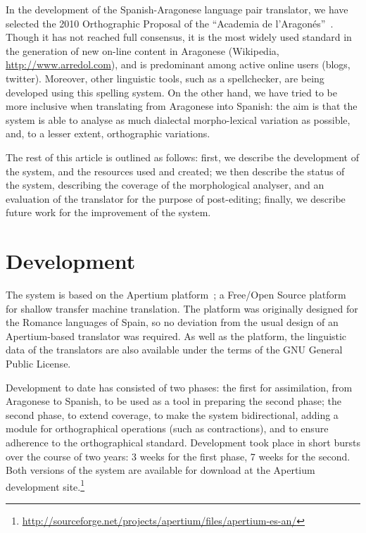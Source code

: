 \documentclass[10pt,a4paper,twocolumn]{article}
\begin{document}
  In the development of the Spanish-Aragonese language pair translator, we have selected the 2010 Orthographic Proposal of the ``Academia de l'Aragonés''~\cite{EFA}. Though it has not reached full consensus, it is the most widely used standard in the generation of new on-line content in Aragonese (Wikipedia, \url{http://www.arredol.com}), and is predominant among active online users (blogs, twitter). Moreover, other linguistic tools, such as a spellchecker, are being developed using this spelling system. On the other hand, we have tried to be more inclusive when translating from Aragonese into Spanish: the aim is that the system is able to analyse as much dialectal morpho-lexical variation as possible, and, to a lesser extent, orthographic variations.
  
  The rest of this article is outlined as follows: first, we describe the development of the system, and the resources used and created; we then describe the status of the system, describing the coverage of the morphological analyser, and an evaluation of the translator for the purpose of post-editing; finally, we describe future work for the improvement of the system.
  
  \section{Development}
  
  The system is based on the Apertium platform~\cite{Forcada}; a Free/Open Source platform for shallow transfer machine translation. The platform was originally designed for the Romance languages of Spain, so no deviation from the usual design of an Apertium-based translator was required. As well as the platform, the linguistic data of the translators are also available under the terms of the GNU General Public License.
  
  Development to date has consisted of two phases: the first for assimilation, from Aragonese to Spanish, to be used as a tool in preparing the second phase; the second phase, to extend coverage, to make the system bidirectional, adding a module for orthographical operations (such as contractions), and to ensure adherence to the orthographical standard. Development took place in short bursts over the course of two years: 3 weeks for the first phase, 7 weeks for the second. Both versions of the system are available for download at the Apertium development site.\footnote{\url{http://sourceforge.net/projects/apertium/files/apertium-es-an/}}
\end{document}
